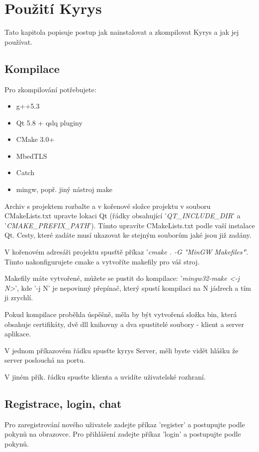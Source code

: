 \documentclass[a4paper]{article}
\begin{document}
\section{Použití Kyrys}
Tato kapitola popisuje postup jak nainstalovat a zkompilovat Kyrys a jak jej používat.
\subsection{Kompilace}

Pro zkompilování potřebujete:
\begin{itemize}
\item g++5.3
\item Qt 5.8 + qslq pluginy
\item CMake 3.0+
\item MbedTLS
\item Catch
\item mingw, popř. jiný nástroj make
\end{itemize}
Archiv s projektem rozbalte a v kořenové složce projektu v souboru CMakeLists.txt upravte lokaci Qt (řádky obsahující '\textit{QT\_INCLUDE\_DIR}' a '\textit{CMAKE\_PREFIX\_PATH}'). Tímto upravíte CMakeLists.txt podle vaší instalace Qt. Cesty, které zadáte musí ukazovat ke stejným souborům jaké jsou již zadány.

V kořenovém adresáři projektu spusťtě příkaz '\textit{cmake . -G "MinGW Makefiles"}'. Tímto nakonfigurujete cmake a vytvoříte makefily pro váš stroj.

Makefily máte vytvořené, můžete se pustit do kompilace: '\textit{mingw32-make <-j N>}', kde '-j N' je nepovinný přepínač, který spustí kompilaci na N jádrech a tím ji zrychlí.

Pokud kompilace proběhla úspěšně, měla by být vytvořená složka bin, která obsahuje certifikáty, dvě dll knihovny a dva spustitelé soubory - klient a server aplikace.

V jednom příkazovém řádku spusťte kyrys Server, měli byste vidět hlášku že server poslouchá na portu.

V jiném přík. řádku spusťte klienta a uvidíte uživatelské rozhraní.

\subsection{Registrace, login, chat}

Pro zaregistrování nového uživatele zadejte příkaz 'register' a postupujte podle pokynů na obrazovce. Pro přihlášení zadejte příkaz 'login' a postupujte podle pokynů.
\end{document}
